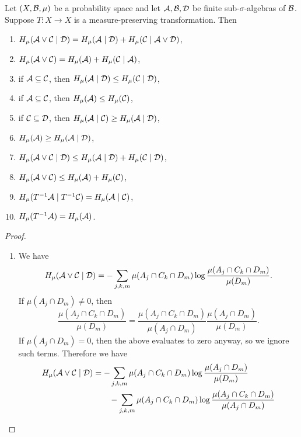 \begin{theorem} \label{thm:walters-4.3}
	Let $(X, \mathcal{B}, \mu)$ be a probability space and let $\mathcal{A}, \mathcal{B}, \mathcal{D}$ be finite sub-$\sigma$-algebras of $\mathcal{B}$. Suppose $T : X \to X$ is a measure-preserving transformation. Then
	\begin{enumerate}
		\item $H_\mu(\mathcal{A} \vee \mathcal{C} \mid \mathcal{D}) = H_\mu(\mathcal{A} \mid \mathcal{D}) + H_\mu(\mathcal{C} \mid \mathcal{A} \vee \mathcal{D})$, \label{walters-thm-4.3:1}
		\item $H_\mu(\mathcal{A} \vee \mathcal{C}) = H_\mu(\mathcal{A}) + H_\mu(\mathcal{C} \mid \mathcal{A})$, \label{walters-thm-4.3:2}
		\item if $\mathcal{A} \subseteq \mathcal{C}$, then $H_\mu(\mathcal{A} \mid \mathcal{D}) \leq H_\mu(\mathcal{C} \mid \mathcal{D})$, \label{walters-thm-4.3:3}
		\item if $\mathcal{A} \subseteq \mathcal{C}$, then $H_\mu(\mathcal{A}) \leq H_\mu(\mathcal{C})$, \label{walters-thm-4.3:4}
		\item if $\mathcal{C} \subseteq \mathcal{D}$, then $H_\mu(\mathcal{A} \mid \mathcal{C}) \geq H_\mu(\mathcal{A} \mid \mathcal{D})$, \label{walters-thm-4.3:5}
		\item $H_\mu(\mathcal{A}) \geq H_\mu(\mathcal{A} \mid \mathcal{D})$, \label{walters-thm-4.3:6}
		\item $H_\mu(\mathcal{A} \vee \mathcal{C} \mid \mathcal{D}) \leq H_\mu(\mathcal{A} \mid \mathcal{D}) + H_\mu(\mathcal{C} \mid \mathcal{D})$, \label{walters-thm-4.3:7}
		\item $H_\mu(\mathcal{A} \vee \mathcal{C}) \leq H_\mu(\mathcal{A}) + H_\mu(\mathcal{C})$, \label{walters-thm-4.3:8}
		\item $H_\mu(T^{-1}\mathcal{A} \mid T^{-1}\mathcal{C}) = H_\mu(\mathcal{A} \mid \mathcal{C})$, \label{walters-thm-4.3:9}
		\item $H_\mu(T^{-1}\mathcal{A}) = H_\mu(\mathcal{A})$. \label{walters-thm-4.3:10}
	\end{enumerate}
	\begin{proof} \hfill
		\begin{enumerate}
			\item We have
				\[
					H_\mu(\mathcal{A} \vee \mathcal{C} \mid \mathcal{D}) = -\sum_{j, k, m}{\mu(A_j \cap C_k \cap D_m) \log{\frac{\mu(A_j \cap C_k \cap D_m)}{\mu(D_m)}}}.
				\]
				If $\mu(A_j \cap D_m) \neq 0$, then
				\[
					\frac{\mu(A_j \cap C_k \cap D_m)}{\mu(D_m)} = \frac{\mu(A_j \cap C_k \cap D_m)}{\mu(A_j \cap D_m)} \frac{\mu(A_j \cap D_m)}{\mu(D_m)}.
				\]
				If $\mu(A_j \cap D_m) = 0$, then the above evaluates to zero anyway, so we ignore such terms. Therefore we have
				\begin{align*}
					H_\mu(\A \join \C \mid \D) &= -\sum_{j, k, m}{\mu(A_j \cap C_k \cap D_m) \log{\frac{\mu(A_j \cap D_m)}{\mu(D_m)}}} \\
						& \qquad - \sum_{j, k, m}{\mu(A_j \cap C_k \cap D_m) \log{\frac{\mu(A_j \cap C_k \cap D_m)}{\mu(A_j \cap D_m)}}} \\

\end{align*}
\end{enumerate}
\end{proof}
\end{theorem}
